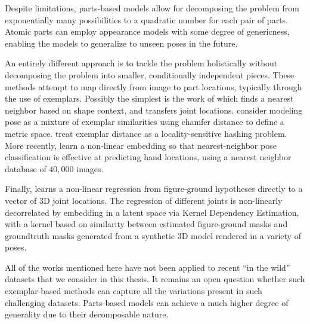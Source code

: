 Despite limitations, parts-based models allow for decomposing the problem from 
exponentially many possibilities to a quadratic number for each pair of parts.  
Atomic parts can employ appearance models with some degree of genericness, 
enabling the models to generalize to unseen poses in the future.

An entirely different approach is to tackle the problem holistically without 
decomposing the problem into smaller, conditionally independent pieces.  These 
methods attempt to map directly from image to part locations, typically through 
the use of exemplars. Possibly the simplest is the work of \citet{mori02} which 
finds a nearest neighbor based on shape context, and transfers joint locations.  
\citet{toyama2002} consider modeling pose as a mixture of exemplar similarities 
using chamfer distance to define a metric space.  \citet{shak2003} treat 
exemplar distance as a locality-sensitive hashing problem.  More recently, 
\citet{taylorpose} learn a non-linear embedding so that nearest-neighbor pose 
classification is effective at predicting hand locations, using a nearest 
neighbor database of $40,000$ images.

Finally, \citet{ionescu2011} learns a non-linear regression from figure-ground 
hypotheses directly to a vector of 3D joint locations.  The regression of 
different joints is non-linearly decorrelated by embedding in a latent space 
via Kernel Dependency Estimation, with a kernel based on similarity between 
estimated figure-ground masks and groundtruth masks generated from a synthetic 
3D model rendered in a variety of poses. 

All of the works mentioned here have not been applied to recent ``in the wild'' 
datasets that we consider in this thesis.  It remains an open question whether 
such exemplar-based methods can capture all the variations present in such 
challenging datasets.  Parts-based models can achieve a much higher degree of 
generality due to their decomposable nature.


